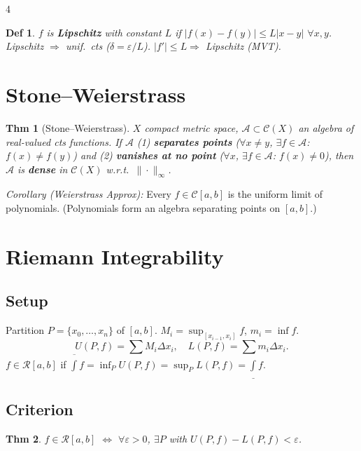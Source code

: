 \documentclass[9pt,landscape]{extarticle}
\newcommand{\eps}{\varepsilon}
\theoremstyle{compact}
\newtheorem*{thm}{Thm}
\theoremstyle{defnstyle}
\newtheorem*{defn}{Def}
\begin{document}
\begin{multicols}{4}
\begin{defn}
$f$ is \textbf{Lipschitz} with constant $L$ if $|f(x)-f(y)|\leq L|x-y|$ $\forall x,y$. Lipschitz $\Rightarrow$ unif.\ cts ($\delta=\eps/L$). $|f'|\leq L \Rightarrow$ Lipschitz (MVT).
\end{defn}

\section{Stone--Weierstrass}

\begin{highlight}
\begin{thm}[Stone--Weierstrass]
$X$ compact metric space, $\mathscr{A} \subset \mathscr{C}(X)$ an algebra of real-valued cts functions. If $\mathscr{A}$ (1) \textbf{separates points} ($\forall x\neq y$, $\exists f\in\mathscr{A}$: $f(x)\neq f(y)$) and (2) \textbf{vanishes at no point} ($\forall x$, $\exists f\in\mathscr{A}$: $f(x)\neq 0$), then $\mathscr{A}$ is \textbf{dense} in $\mathscr{C}(X)$ w.r.t.\ $\|\cdot\|_\infty$.
\end{thm}
\end{highlight}

\textit{Corollary (Weierstrass Approx):} Every $f \in \mathscr{C}[a,b]$ is the uniform limit of polynomials. (Polynomials form an algebra separating points on $[a,b]$.)

\section{Riemann Integrability}

\subsection{Setup}
Partition $P = \{x_0, \ldots, x_n\}$ of $[a,b]$. $M_i = \sup_{[x_{i-1},x_i]}f$, $m_i = \inf f$.
$$U(P,f) = \sum M_i \Delta x_i, \quad L(P,f) = \sum m_i \Delta x_i.$$
$f \in \mathscr{R}[a,b]$ if $\overline{\int}f = \inf_P U(P,f) = \sup_P L(P,f) = \underline{\int}f$.

\subsection{Criterion}
\begin{thm}
$f \in \mathscr{R}[a,b]$ $\Leftrightarrow$ $\forall \eps > 0$, $\exists P$ with $U(P,f) - L(P,f) < \eps$.
\end{thm}


\end{multicols}
\end{document}
